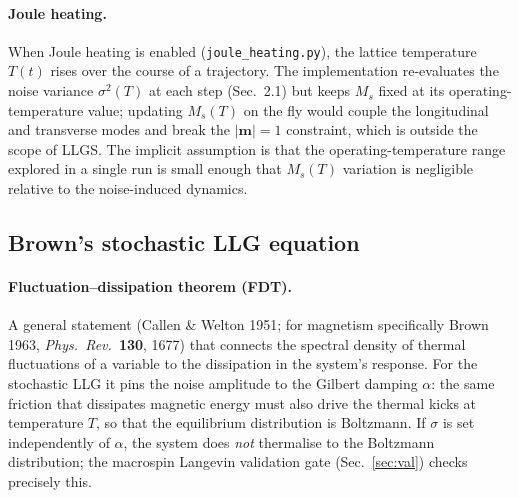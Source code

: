 \documentclass[11pt,a4paper]{article}
\newcommand{\mb}[1]{\mathbf{#1}}
\begin{document}
\paragraph{Joule heating.} When Joule heating is enabled
(\texttt{joule\_heating.py}), the lattice temperature $T(t)$ rises over
the course of a trajectory. The implementation re-evaluates the
noise variance $\sigma^2(T)$ at each step (Sec.~2.1) but keeps $M_s$
fixed at its operating-temperature value; updating $M_s(T)$ on the fly
would couple the longitudinal and transverse modes and break the
$|\mb{m}|=1$ constraint, which is outside the scope of LLGS. The
implicit assumption is that the operating-temperature range explored
in a single run is small enough that $M_s(T)$ variation is negligible
relative to the noise-induced dynamics.

\subsection{Brown's stochastic LLG equation}

\paragraph{Fluctuation--dissipation theorem (FDT).}
A general statement (Callen \& Welton 1951; for magnetism specifically
Brown 1963, \emph{Phys.\ Rev.}\ \textbf{130}, 1677) that connects the
spectral density of thermal fluctuations of a variable to the
dissipation in the system's response. For the stochastic LLG it pins
the noise amplitude to the Gilbert damping $\alpha$: the same friction
that dissipates magnetic energy must also drive the thermal kicks at
temperature $T$, so that the equilibrium distribution is Boltzmann. If
$\sigma$ is set independently of $\alpha$, the system does \emph{not}
thermalise to the Boltzmann distribution; the macrospin Langevin
validation gate (Sec.~\ref{sec:val}) checks precisely this.
\end{document}
